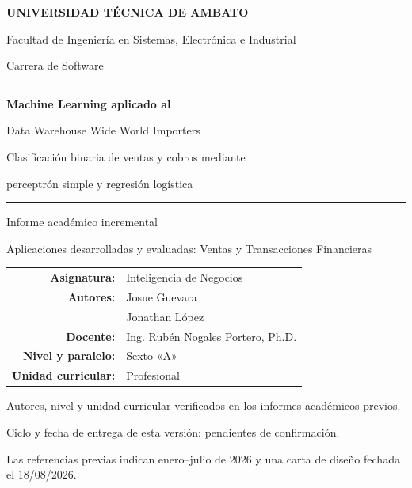 \documentclass[11pt,a4paper]{article}
\begin{document}
\hypersetup{pageanchor=false}
\begin{titlepage}
\centering
{\Large\bfseries UNIVERSIDAD TÉCNICA DE AMBATO\par}
\vspace{0.4cm}
{\large Facultad de Ingeniería en Sistemas, Electrónica e Industrial\par}
{\large Carrera de Software\par}
\vspace{1.8cm}
\textcolor{blue!45!black}{\rule{\linewidth}{1.2pt}}\par
\vspace{0.6cm}
{\LARGE\bfseries Machine Learning aplicado al\par Data Warehouse Wide World Importers\par}
\vspace{0.6cm}
{\Large Clasificación binaria de ventas y cobros mediante\par perceptrón simple y regresión logística\par}
\vspace{0.6cm}
\textcolor{blue!45!black}{\rule{\linewidth}{1.2pt}}\par
\vspace{0.8cm}
{\large Informe académico incremental\par}
Aplicaciones desarrolladas y evaluadas: Ventas y Transacciones Financieras\par
\vspace{1cm}
\begin{tabular}{rl}
\textbf{Asignatura:} & Inteligencia de Negocios\\
\textbf{Autores:} & Josue Guevara\\ & Jonathan López\\
\textbf{Docente:} & Ing. Rubén Nogales Portero, Ph.D.\\
\textbf{Nivel y paralelo:} & Sexto «A»\\
\textbf{Unidad curricular:} & Profesional
\end{tabular}
\vfill
\small Autores, nivel y unidad curricular verificados en los informes académicos previos.\par
Ciclo y fecha de entrega de esta versión: pendientes de confirmación.\par
Las referencias previas indican enero--julio de 2026 y una carta de diseño fechada el 18/08/2026.\par
\end{titlepage}
\hypersetup{pageanchor=true}

\clearpage
\tableofcontents
\clearpage
\begingroup\small
\listoffigures
\endgroup
\clearpage
\listoftables
\clearpage
{}










\clearpage

\clearpage
\appendix

\end{document}
